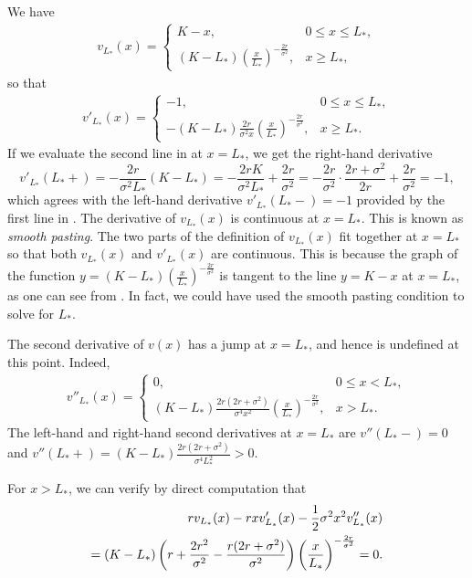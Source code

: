 We have
\begin{align} \label{eq:PiecewiseValue}
	v_{L_*}(x) = \begin{cases} K - x, & 0 \le x \le L_*, \\ (K - L_*) \left( \frac{x}{L_*} \right)^{-\frac{2r}{\sigma^2}}, & x \ge L_*, \end{cases}
\end{align}
so that
\begin{align} \label{eq:PiecewiseDerivative}
	v'_{L_*}(x) = \begin{cases} -1, & 0 \le x \le L_*, \\ -(K - L_*) \frac{2r}{\sigma^2 x} \left( \frac{x}{L_*} \right)^{-\frac{2r}{\sigma^2}}, & x \ge L_*. \end{cases}
\end{align}
If we evaluate the second line in  at $x = L_*$, we get the right-hand derivative
\[
	v'_{L_*}(L_*+) = - \frac{2r}{\sigma^2 L_*} (K - L_*) = - \frac{2rK}{\sigma^2 L_*} + \frac{2r}{\sigma^2} = - \frac{2r}{\sigma^2} \cdot \frac{2r + \sigma^2}{2r} + \frac{2r}{\sigma^2} = -1,
\]
which agrees with the left-hand derivative $v'_{L_*}(L_*-) = -1$ provided by the first line in . The derivative of $v_{L_*}(x)$ is continuous at $x = L_*$. This is known as \textit{smooth pasting}. The two parts of the definition of $v_{L_*}(x)$ fit together at $x = L_*$ so that both $v_{L_*}(x)$ and $v'_{L_*}(x)$ are continuous. This is because the graph of the function $y = (K - L_*)(\frac{x}{L_*})^{-\frac{2r}{\sigma^2}}$ is tangent to the line $y = K - x$ at $x = L_*$, as one can see from . In fact, we could have used the smooth pasting condition to solve for $L_*$.

The second derivative of $v(x)$ has a jump at $x = L_*$, and hence is undefined at this point. Indeed,
\begin{align} \label{eq:PiecewiseSecondDeriv}
	v''_{L_*}(x) = \begin{cases} 0, & 0 \le x < L_*, \\ (K - L_*) \frac{2r(2r + \sigma^2)}{\sigma^4 x^2} \left( \frac{x}{L_*} \right)^{-\frac{2r}{\sigma^2}}, & x > L_*. \end{cases}
\end{align}
The left-hand and right-hand second derivatives at $x = L_*$ are $v''(L_*-) = 0$ and $v''(L_*+) = (K - L_*) \frac{2r(2r+\sigma^2)}{\sigma^4 L_*^2} > 0$.

For $x > L_*$, we can verify by direct computation that
\begin{align} \label{eq:OperatorCheckActionRegion}
	rv_{L_*}(x) - rxv'_{L_*}(x) - \frac{1}{2}\sigma^2 x^2 v''_{L_*}(x) \notag \\
	= (K - L_*) \left( r + \frac{2r^2}{\sigma^2} - \frac{r(2r + \sigma^2)}{\sigma^2} \right) \left( \frac{x}{L_*} \right)^{-\frac{2r}{\sigma^2}} = 0.
\end{align}

